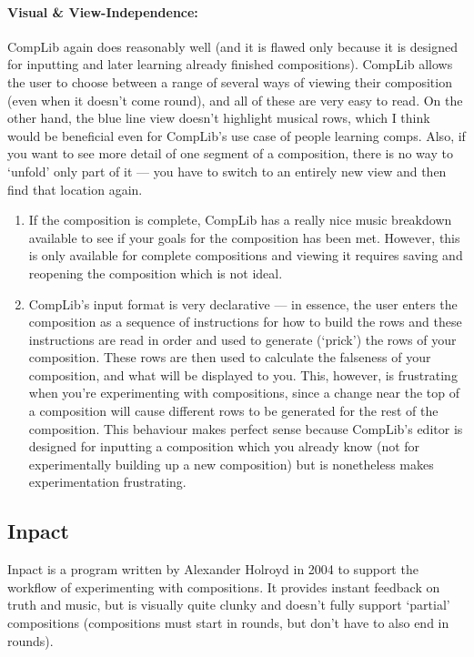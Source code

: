 \documentclass[12pt]{article}
\begin{document}
\paragraph{Visual \& View-Independence:}  CompLib again does reasonably well (and it is flawed only
because it is designed for inputting and later learning already finished compositions).
CompLib allows the user to choose between a range of several ways of viewing their composition (even
when it doesn't come round), and all of these are very easy to read.  On the other hand, the
blue line view doesn't highlight musical rows, which I think would be beneficial even for CompLib's
use case of people learning comps.  Also, if you want to see more detail of one segment of a
composition, there is no way to `unfold' only part of it --- you have to switch to an entirely new
view and then find that location again.

\begin{enumerate}
    \item If the composition is complete, CompLib has a really nice music breakdown available to see
        if your goals for the composition has been met.  However, this is only available for
        complete compositions and viewing it requires saving and reopening the composition which is
        not ideal.
    \item CompLib's input format is very declarative --- in essence, the user enters the composition
        as a sequence of instructions for how to build the rows and these instructions are read
        in order and used to generate (`prick') the rows of your composition.  These rows are then
        used to calculate the falseness of your composition, and what will be displayed to you.
        This, however, is frustrating when you're experimenting with compositions, since a change
        near the top of a composition will cause different rows to be generated for the rest of the
        composition.  This behaviour makes perfect sense because CompLib's editor is designed for
        inputting a composition which you already know (not for experimentally building up a new
        composition) but is nonetheless makes experimentation frustrating.
\end{enumerate}

\subsection{Inpact}

Inpact is a program written by Alexander Holroyd in 2004 to support the workflow of experimenting
with compositions.  It provides instant feedback on truth and music, but is visually quite clunky
and doesn't fully support `partial' compositions (compositions must start in rounds, but don't have
to also end in rounds).
\end{document}
